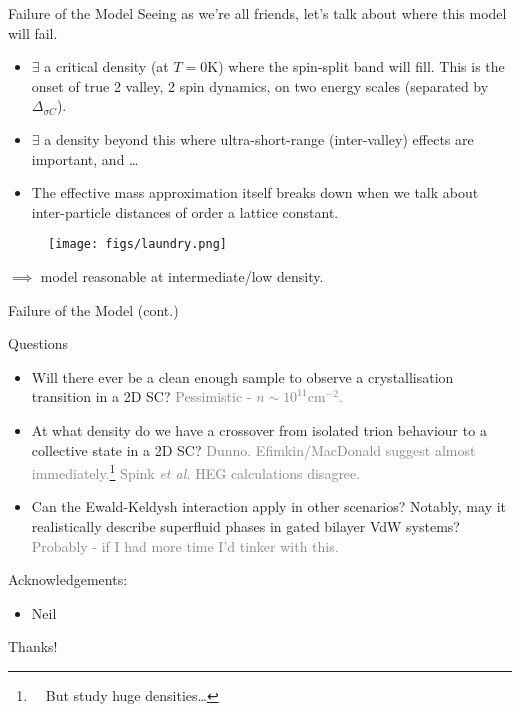 \documentclass[10pt, pdf, hyperref={draft}, usenames, dvipsnames]{beamer}
\begin{document}
\begin{frame}{Failure of the Model}
Seeing as we're all friends, let's talk about where this model will
fail.
\begin{minipage}[t]{0.60\textwidth}

\begin{itemize}
  \item $\exists$ a critical density (at $T=0$K) where the spin-split band
  will fill. This is the onset of true 2 valley, 2 spin dynamics, on two energy
  scales (separated by $\Delta_{\sigma C}$).\footnotemark
  \item $\exists$ a density beyond this where ultra-short-range (inter-valley)
  effects are important, and \ldots
  \item The effective mass approximation itself breaks down when we talk about
  inter-particle distances of order a lattice constant.
\end{itemize}

\end{minipage}%
\hfill
\begin{minipage}[t]{0.3\textwidth}

\begin{figure}[H]
  \centering
  \texttt{[image: figs/laundry.png]}
\end{figure}

\end{minipage}%
\vfill
$\implies$ model reasonable at intermediate/low density.
\end{frame}

\begin{frame}{Failure of the Model (cont.)}
\begin{block}{Questions}
\begin{itemize}
  \item Will there ever be a clean enough sample to observe a crystallisation
  transition in a 2D SC? \textcolor{gray}{Pessimistic -
  $n\sim10^{11}\text{cm}^{-2}$.}
  \item At what density do we have a crossover from isolated trion behaviour to
  a collective state in a 2D SC? \textcolor{gray}{Dunno. Efimkin/MacDonald
  suggest almost immediately.\footnote{~~But study huge densities\ldots} Spink \textit{et al.} HEG calculations disagree.}
  \item Can the Ewald-Keldysh interaction apply in other scenarios? Notably,
  may it realistically describe superfluid phases in gated bilayer VdW
  systems? \textcolor{gray}{Probably - if I had more time I'd tinker with this.}
\end{itemize}
\end{block}
\end{frame}



\begin{frame}
Acknowledgements:
\begin{itemize}
  \item Neil
\end{itemize}
\vfill
\begin{center}
  {\Large Thanks!}
\end{center}
\vfill
\end{frame}
\end{document}

